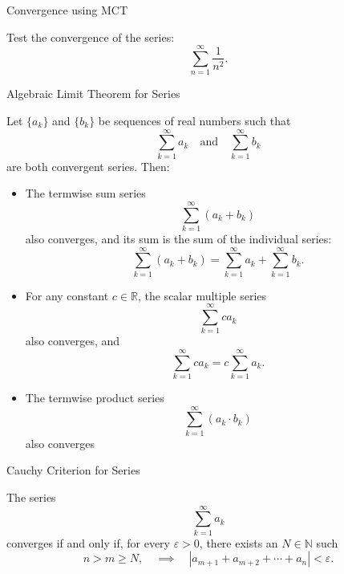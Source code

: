 \documentclass[12pt, a4paper]{article}
\begin{document}
\clearpage

\begin{heading}
	Convergence using MCT
\end{heading}

\vspace{10pt}

\begin{problem}
Test the convergence of the series:
\[
\sum_{n=1}^{\infty} \frac{1}{n^{2}}.
\]
\end{problem}

\clearpage

\begin{heading}
	Algebraic Limit Theorem for Series
\end{heading}

\vspace{10pt}

\begin{theorem}
Let $\{a_k\}$ and $\{b_k\}$ be sequences of real numbers such that
\[
\sum_{k=1}^{\infty} a_k \quad \text{and} \quad \sum_{k=1}^{\infty} b_k
\]
are both convergent series. Then:

\begin{itemize}
    \item[(i)] The termwise sum series
    \[
    \sum_{k=1}^{\infty} (a_k + b_k)
    \]
    also converges, and its sum is the sum of the individual series:
    \[
    \sum_{k=1}^{\infty} (a_k + b_k)
    = 
    \sum_{k=1}^{\infty} a_k
    + 
    \sum_{k=1}^{\infty} b_k.
    \]

	\item[(ii)] For any constant $c \in \mathbb{R}$, the scalar multiple series
    \[
    \sum_{k=1}^{\infty} c a_k
    \]
    also converges, and
    \[
    \sum_{k=1}^{\infty} c a_k
    =
    c \sum_{k=1}^{\infty} a_k.
    \]

    \item[(iii)] The termwise product series
    \[
    \sum_{k=1}^{\infty} (a_k \cdot b_k)
    \]
    also converges
\end{itemize}
\end{theorem}


\clearpage

\begin{heading}
	Cauchy Criterion for Series
\end{heading}

\vspace{10pt}

\begin{theorem}
	The series 
	\[
	\sum_{k=1}^{\infty} a_k
	\]
	converges if and only if, for every $\varepsilon > 0$, there exists an $N \in \mathbb{N}$ such
	\[
	n > m \ge N, \quad \implies \quad \left| a_{m+1} + a_{m+2} + \cdots + a_{n} \right| < \varepsilon.
	\]
\end{theorem}
\end{document}
